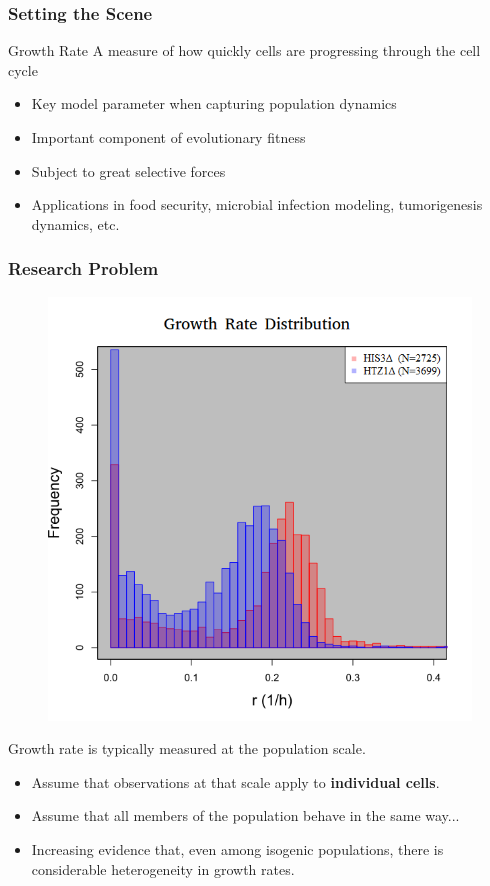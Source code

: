 \documentclass{beamer}
\begin{document}
\begin{frame}
\frametitle{Setting the Scene}
\begin{block}{Growth Rate}
A measure of how quickly cells are progressing through the cell cycle
\end{block}
\vspace{+1em}
\begin{itemize}
\item Key model parameter when capturing population dynamics
\item Important component of evolutionary fitness
\item Subject to great selective forces
\item Applications in food security, microbial infection modeling, tumorigenesis dynamics, etc.
\end{itemize}
\end{frame}

\begin{frame}
\frametitle{Research Problem}
\vspace{-2em}
\begin{figure}
\includegraphics[width=0.4\linewidth]{GrowthRateDistr.png}
\end{figure}
\vspace{-2em}
\begin{block}{Growth rate is typically measured at the population scale.}
\begin{itemize}
\item Assume that observations at that scale apply to \textbf{individual cells}.
\item Assume that all members of the population behave in the same way... 
\item Increasing evidence that, even among isogenic populations, there is considerable heterogeneity in growth rates.
\end{itemize}
\end{block}
\end{frame}
\end{document}
